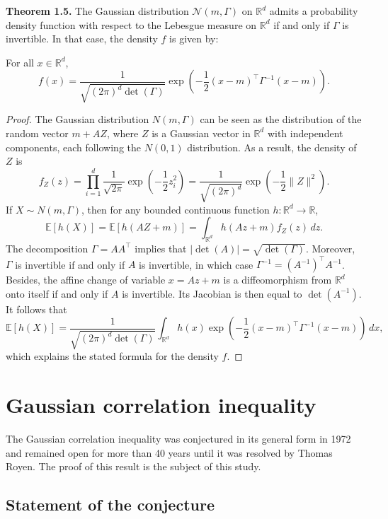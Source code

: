 \documentclass[12pt]{article}
\begin{document}
\vspace{0.3cm}

\textbf{Theorem 1.5.}
The Gaussian distribution $\mathcal{N}(m, \Gamma)$ on $\mathbb{R}^d$ admits a probability density function with respect to the Lebesgue measure on $\mathbb{R}^d$ if and only if $\Gamma$ is invertible.
In that case, the density $f$ is given by:

For all $x \in \mathbb{R}^d$,
\[
f(x) = \frac{1}{\sqrt{(2\pi)^d \det(\Gamma)}} \exp \left( -\frac{1}{2} (x - m)^\top \Gamma^{-1} (x - m) \right).
\]

\begin{proof}
The Gaussian distribution $N(m, \Gamma)$ can be seen as the distribution of the random vector
$m + AZ$, where $Z$ is a Gaussian vector in $\mathbb{R}^d$ with independent components, each following the
$N(0, 1)$ distribution. As a result, the density of $Z$ is
\[
f_Z(z) = \prod_{i=1}^{d} \frac{1}{\sqrt{2\pi}} \exp\left( -\frac{1}{2} z_i^2 \right)
= \frac{1}{\sqrt{(2\pi)^d}} \exp\left( -\frac{1}{2} \|Z\|^2 \right).
\]
If $X \sim N(m, \Gamma)$, then for any bounded continuous function $h : \mathbb{R}^d \to \mathbb{R}$,
\[
\mathbb{E}[h(X)] = \mathbb{E}[h(AZ + m)] = \int_{\mathbb{R}^d} h(Az + m) f_Z(z) \, dz.
\]
The decomposition $\Gamma = A A^\top$ implies that $|\det(A)| = \sqrt{\det(\Gamma)}$. Moreover, $\Gamma$ is invertible if and only if $A$ is invertible, in which case  $\Gamma^{-1} = (A^{-1})^\top A^{-1}$.
Besides, the affine change of variable $x = Az + m$ is a diffeomorphism from $\mathbb{R}^d$ onto itself if and only if $A$ is invertible. Its Jacobian is then equal to $\det(A^{-1})$. It follows that
\[
\mathbb{E}[h(X)] = \frac{1}{\sqrt{(2\pi)^d \det(\Gamma)}} \int_{\mathbb{R}^d} h(x) \exp\left( -\frac{1}{2} (x - m)^\top \Gamma^{-1} (x - m) \right) \, dx,
\]
which explains the stated formula for the density $f$.
\end{proof}

\newpage

\section{Gaussian correlation inequality}

The Gaussian correlation inequality was conjectured in its general form in 1972 and remained open for more than 40 years until it was resolved by Thomas Royen. The proof of this result is the subject of this study.

\subsection{Statement of the conjecture}
\end{document}
